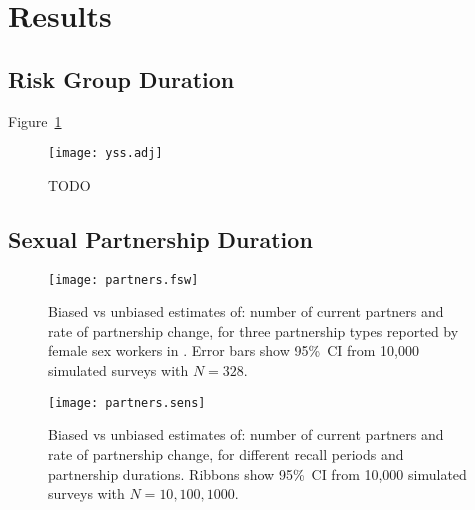 \section{Results}
\subsection{Risk Group Duration}\label{res.yss}
Figure~\ref{fig:yss.adj}
\begin{figure}
  \centering\texttt{[image: yss.adj]}
  \caption{TODO}
  \label{fig:yss.adj}
\end{figure}
\subsection{Sexual Partnership Duration}\label{res.partners}
\begin{figure}[h]
  \centering\texttt{[image: partners.fsw]}
  \caption{Biased vs unbiased estimates of:
    number of current partners and rate of partnership change,
    for three partnership types reported by female sex workers in \cite{Baral2014}.
    Error bars show 95\%~CI from 10,000 simulated surveys with $N = 328$.}
  \label{fig:partners.fsw}
\end{figure}
\begin{figure}[h]
  \centering\texttt{[image: partners.sens]}
  \caption{Biased vs unbiased estimates of:
    number of current partners and rate of partnership change,
    for different recall periods and partnership durations.
    Ribbons show 95\%~CI from 10,000 simulated surveys with $N = 10, 100, 1000$.}
  \label{fig:partners.sens}
\end{figure}
